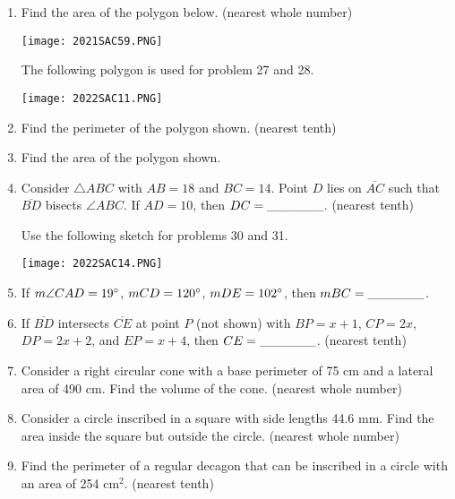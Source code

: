 \documentclass[../uilmath.tex]{subfiles}
\begin{document}
\begin{enumerate}[label=\bfseries\arabic*.]
    \item %
    Find the area of the polygon below. (nearest whole number)
    \begin{center}
        \texttt{[image: 2021SAC59.PNG]}
    \end{center}


    The following polygon is used for problem 27 and 28.
    \begin{center}
        \texttt{[image: 2022SAC11.PNG]}
    \end{center}
    \item %
    Find the perimeter of the polygon shown. (nearest tenth)

    \item %
    Find the area of the polygon shown.

    \item %
    Consider $\triangle ABC$ with $AB=18$ and $BC=14$. Point $D$ lies on $\overline{AC}$ such that $\overline{BD}$ bisects $\angle ABC$. 
    If $AD=10$, then $DC=\_\_\_\_\_\_$. (nearest tenth)


    Use the following sketch for problems 30 and 31.
    \begin{center}
        \texttt{[image: 2022SAC14.PNG]}
    \end{center}
    \item %
    If $m\angle CAD=19\degree$, $mCD=120\degree$, $mDE=102\degree$, then $mBC=\_\_\_\_\_\_$.

    \item %
    If $\overline{BD}$ intersects $\overline{CE}$ at point $P$ (not shown) with $BP=x+1$, $CP=2x$, $DP=2x+2$, and $EP=x+4$, then $CE=\_\_\_\_\_\_$. (nearest tenth)

    \item %
    Consider a right circular cone with a base perimeter of 75 cm and a lateral area of 490 cm. Find the volume of the cone. (nearest whole number)

    \item %
    Consider a circle inscribed in a square with side lengths 44.6 mm. Find the area inside the square but outside the circle. (nearest whole number)

    \item %
    Find the perimeter of a regular decagon that can be inscribed in a circle with an area of 254 cm$^2$. (nearest tenth)



\end{enumerate}
\end{document}
